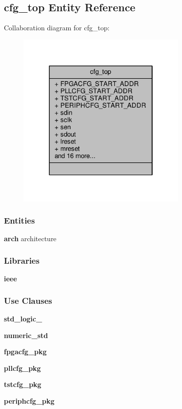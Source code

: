 \subsection{cfg\+\_\+top Entity Reference}
\label{classcfg__top}


Collaboration diagram for cfg\+\_\+top\+:\nopagebreak
\begin{figure}[H]
\begin{center}
\leavevmode
\includegraphics[width=238pt]{dd/d56/classcfg__top__coll__graph}
\end{center}
\end{figure}
\subsubsection*{Entities}
\begin{DoxyCompactItemize}
\item 
{\bf arch} architecture
\end{DoxyCompactItemize}
\subsubsection*{Libraries}
 \begin{DoxyCompactItemize}
\item 
{\bf ieee} 
\end{DoxyCompactItemize}
\subsubsection*{Use Clauses}
 \begin{DoxyCompactItemize}
\item 
{\bf std\+\_\+logic\+\_}   
\item 
{\bf numeric\+\_\+std}   
\item 
{\bf fpgacfg\+\_\+pkg}   
\item 
{\bf pllcfg\+\_\+pkg}   
\item 
{\bf tstcfg\+\_\+pkg}   
\item 
{\bf periphcfg\+\_\+pkg}   
\end{DoxyCompactItemize}
